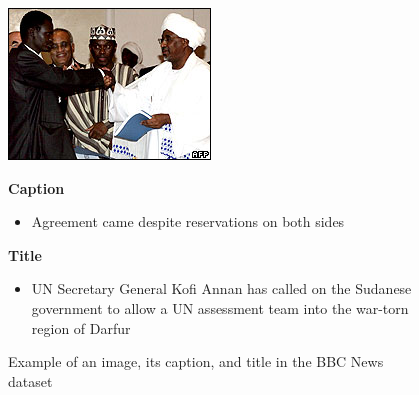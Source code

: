 \begin{figure}[t]
  \begin{minipage}{0.45\linewidth}
    \centering
    \includegraphics[width=.8\textwidth]{chpt9_ia/figures/bbc_img.jpg}
  \end{minipage}
  \begin{minipage}{0.45\linewidth}
    \centering
    \footnotesize
    \textbf{Caption}
    \begin{itemize}
    \item Agreement came despite reservations on both sides
    \end{itemize}
    \textbf{Title}
    \begin{itemize}
    \item UN Secretary General Kofi Annan has called on the Sudanese government to allow a
      UN assessment team into the war-torn region of Darfur
    \end{itemize}
  \end{minipage}
  \caption{Example of an image, its caption, and title in the BBC News dataset}
  \label{fig:chpt9:bbc_ex}
\end{figure}


